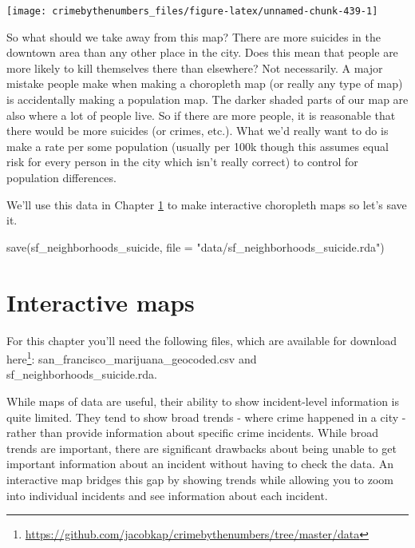 \documentclass[
]{krantz}
\makeatletter
\newenvironment{Shaded}{\begin{snugshade}}{\end{snugshade}}
\newcommand{\AttributeTok}[1]{\textcolor[rgb]{0.61,0.61,0.61}{#1}}
\newcommand{\FunctionTok}[1]{\textcolor[rgb]{0,0,0}{#1}}
\newcommand{\NormalTok}[1]{#1}
\newcommand{\StringTok}[1]{\textcolor[rgb]{0.5,0.5,0.5}{#1}}
\renewcommand{\href}[2]{#2\footnote{\url{#1}}}
\newenvironment{kframe}{%
\medskip{}
\setlength{\fboxsep}{.8em}
 \def\at@end@of@kframe{}%
 \ifinner\ifhmode%
  \def\at@end@of@kframe{\end{minipage}}%
  \begin{minipage}{\columnwidth}%
 \fi\fi%
 \def\FrameCommand##1{\hskip\@totalleftmargin \hskip-\fboxsep
 \colorbox{shadecolor}{##1}\hskip-\fboxsep
     \hskip-\linewidth \hskip-\@totalleftmargin \hskip\columnwidth}%
 \MakeFramed {\advance\hsize-\width
   \@totalleftmargin\z@ \linewidth\hsize
   \@setminipage}}%
 {\par\unskip\endMakeFramed%
 \at@end@of@kframe}
\renewenvironment{Shaded}{\begin{kframe}}{\end{kframe}}
\makeatother
\begin{document}
\begin{center}\texttt{[image: crimebythenumbers\_files/figure-latex/unnamed-chunk-439-1]} \end{center}

So what should we take away from this map? There are more
suicides in the downtown area than any other place in the
city. Does this mean that people are more likely to kill
themselves there than elsewhere? Not necessarily. A major
mistake people make when making a choropleth map (or really
any type of map) is accidentally making a population map.
The darker shaded parts of our map are also where a lot of
people live. So if there are more people, it is reasonable
that there would be more suicides (or crimes, etc.). What
we'd really want to do is make a rate per some population
(usually per 100k though this assumes equal risk for every
person in the city which isn't really correct) to control
for population differences.

We'll use this data in Chapter \ref{interactive-maps} to
make interactive choropleth maps so let's save it.

\begin{Shaded}
\begin{Highlighting}[]
\FunctionTok{save}\NormalTok{(sf\_neighborhoods\_suicide, }\AttributeTok{file =} \StringTok{"data/sf\_neighborhoods\_suicide.rda"}\NormalTok{)}
\end{Highlighting}
\end{Shaded}

\hypertarget{interactive-maps}{%
\chapter{Interactive maps}\label{interactive-maps}}

For this chapter you'll need the following files, which are
available for download
\href{https://github.com/jacobkap/crimebythenumbers/tree/master/data}{here}:
san\_francisco\_marijuana\_geocoded.csv and
sf\_neighborhoods\_suicide.rda.

While maps of data are useful, their ability to show
incident-level information is quite limited. They tend to
show broad trends - where crime happened in a city - rather
than provide information about specific crime incidents.
While broad trends are important, there are significant
drawbacks about being unable to get important information
about an incident without having to check the data. An
interactive map bridges this gap by showing trends while
allowing you to zoom into individual incidents and see
information about each incident.
\end{document}
